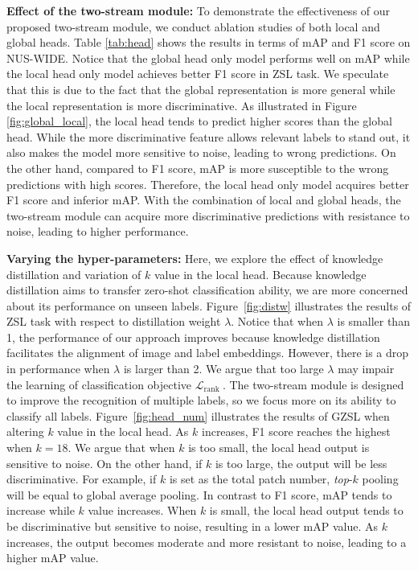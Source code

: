 \documentclass[letterpaper]{article} %
\begin{document}
\noindent\textbf{Effect of the two-stream module:}
To demonstrate the effectiveness of our proposed two-stream module, we conduct ablation studies of both local and global heads.
Table \ref{tab:head} shows the results in terms of mAP and F1 score on NUS-WIDE.
Notice that the global head only model performs well on mAP while the local head only model achieves better F1 score in ZSL task.
We speculate that this is due to the fact that the global representation is more general while the local representation is more discriminative.
As illustrated in Figure \ref{fig:global_local}, the local head tends to predict higher scores than the global head.
While the more discriminative feature allows relevant labels to stand out, it also makes the model more sensitive to noise, leading to wrong predictions.
On the other hand, compared to F1 score, mAP is more susceptible to the wrong predictions with high scores. 
Therefore, the local head only model acquires better F1 score and inferior mAP.
With the combination of local and global heads, the two-stream module can acquire more discriminative predictions with resistance to noise, leading to higher performance.


\noindent\textbf{Varying the hyper-parameters:}
Here, we explore the effect of knowledge distillation and variation of $k$ value in the local head.
Because knowledge distillation aims to transfer zero-shot classification ability, we are more concerned about its performance on unseen labels.
Figure~\ref{fig:distw} illustrates the results of ZSL task with respect to distillation weight $\lambda$. 
Notice that when $\lambda$ is smaller than 1, the performance of our approach improves because knowledge distillation facilitates the alignment of image and label embeddings. 
However, there is a drop in performance when $\lambda$ is larger than 2. 
We argue that too large $\lambda$ may impair the learning of classification objective $\mathcal{L}_{\text {rank }}$.
The two-stream module is designed to improve the recognition of multiple labels, so we focus more on its ability to classify all labels.
Figure~\ref{fig:head_num} illustrates the results of GZSL when altering $k$ value in the local head.
As $k$ increases, F1 score reaches the highest when $k {=} 18$.
We argue that when $k$ is too small, the local head output is sensitive to noise. 
On the other hand, if $k$ is too large, the output will be less discriminative. 
For example, if $k$ is set as the total patch number, \textit{top}-$k$ pooling will be equal to global average pooling.
In contrast to F1 score, mAP tends to increase while $k$ value increases.
When $k$ is small, the local head output tends to be discriminative but sensitive to noise, resulting in a lower mAP value.
As $k$ increases, the output becomes moderate and more resistant to noise, leading to a higher mAP value.

\end{document}
